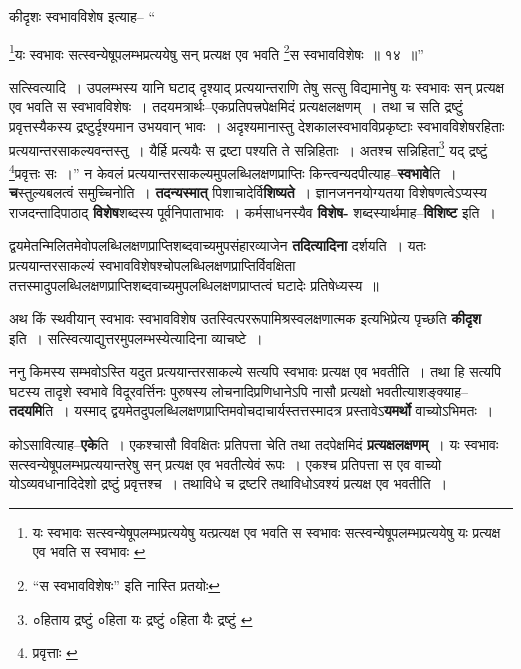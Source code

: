 \documentclass[article,12pt,a4paper]{memoir}
\begin{document}
	कीदृशः स्वभावविशेष इत्याह-- “
	  
	\footnote{यः स्वभावः सत्स्वन्येषूपलम्भप्रत्ययेषु यत्प्रत्यक्ष एव भवति स स्वभावः \cite{dp-msB} \cite{dp-edP} \cite{dp-edH} सत्स्वन्येषूपलम्भप्रत्ययेषु यः प्रत्यक्ष एव भवति स स्वभावः \cite{dp-edE}}यः स्वभावः सत्स्वन्येषूपलम्भप्रत्ययेषु सन् प्रत्यक्ष एव भवति \footnote{“स स्वभावविशेषः” इति नास्ति \cite{dp-msC} \cite{dp-msD} प्रतयोः}स स्वभावविशेषः ॥ १४ ॥” 
	  
	सत्स्वित्यादि । उपलम्भस्य यानि घटाद् दृश्याद् प्रत्ययान्तराणि तेषु सत्सु विद्यमानेषु यः स्वभावः सन् प्रत्यक्ष एव भवति स स्वभावविशेषः । तदयमत्रार्थः--एकप्रतिपत्त्रपेक्षमिदं प्रत्यक्षलक्षणम् । तथा च सति द्रष्टुं प्रवृत्तस्यैकस्य द्रष्टुर्दृश्यमान उभयवान् भावः । अदृश्यमानास्तु देशकालस्वभावविप्रकृष्टाः स्वभावविशेषरहिताः प्रत्ययान्तरसाकल्यवन्तस्तु । यैर्हि प्रत्ययैः स द्रष्टा पश्यति ते सन्निहिताः । अतश्च सन्निहिता\footnote{०हिताय द्रष्टुं \cite{dp-msA} \cite{dp-edP} \cite{dp-edE} ०हिता यः द्रष्टुं \cite{dp-edH} ०हिता यैः द्रष्टुं \cite{dp-edN}} यद् द्रष्टुं \footnote{प्रवृत्ताः \cite{dp-msB}}प्रवृत्तः सः ।” न केवलं प्रत्ययान्तरसाकल्यमुपलब्धिलक्षणप्राप्तिः किन्त्वन्यदपीत्याह--\textbf{स्वभावे}ति । \textbf{च}स्तुल्यबलत्वं समुच्चिनोति । \textbf{तदन्यस्मात्} पिशाचादेर्वि\textbf{शिष्यते} । ज्ञानजननयोग्यतया विशेषणत्वेऽप्यस्य राजदन्तादिपाठाद् \textbf{विशेष}शब्दस्य पूर्वनिपाता\leavevmode{}भावः । कर्मसाधनस्यैव \textbf{विशेष-} शब्दस्यार्थमाह--\textbf{विशिष्ट} इति ।
	\pend
      

	  \pstart द्वयमेतन्मिलितमेवोपलब्धिलक्षणप्राप्तिशब्दवाच्यमुपसंहारव्याजेन \textbf{तदित्यादिना} दर्शयति । यतः प्रत्ययान्तरसाकल्यं स्वभावविशेषश्चोपलब्धिलक्षणप्राप्तिर्विवक्षिता तत्तस्मादुपलब्धिलक्षणप्राप्तिशब्दवाच्यमुपलब्धिलक्षणप्राप्तत्वं घटादेः प्रतिषेध्यस्य ॥
	\pend
      

	  \pstart अथ किं स्थवीयान् स्वभावः स्वभावविशेष उतस्वित्पररूपामिश्रस्वलक्षणात्मक इत्यभिप्रेत्य पृच्छति \textbf{कीदृश} इति । सत्स्वित्याद्युत्तरमुपलम्भस्येत्यादिना व्याचष्टे ।
	\pend
      

	  \pstart ननु किमस्य सम्भवोऽस्ति यदुत प्रत्ययान्तरसाकल्ये सत्यपि स्वभावः प्रत्यक्ष एव भवतीति । तथा हि सत्यपि घटस्य तादृशे स्वभावे विदूरवर्त्तिनः पुरुषस्य लोचनादिप्रणिधानेऽपि नासौ प्रत्यक्षो भवतीत्याशङ्क्याह--\textbf{तदयमि}ति । यस्माद् द्वयमेतदुपलब्धिलक्षणप्राप्तिमवोचदाचार्यस्तत्तस्मादत्र प्रस्तावेऽ\textbf{यमर्थो} वाच्योऽभिमतः ।
	\pend
      

	  \pstart कोऽसावित्याह--\textbf{एके}ति । एकश्चासौ विवक्षितः प्रतिपत्ता चेति तथा तदपेक्षमिदं \textbf{प्रत्यक्षलक्षणम्} । यः स्वभावः सत्स्वन्येषूपलम्भप्रत्ययान्तरेषु सन् प्रत्यक्ष एव भवतीत्येवं रूपः । एकश्च प्रतिपत्ता स एव वाच्यो योऽव्यवधानादिदेशो द्रष्टुं प्रवृत्तश्च । तथाविधे च द्रष्टरि तथाविधोऽवश्यं प्रत्यक्ष एव भवतीति ।
	\pend
      
\end{document}
